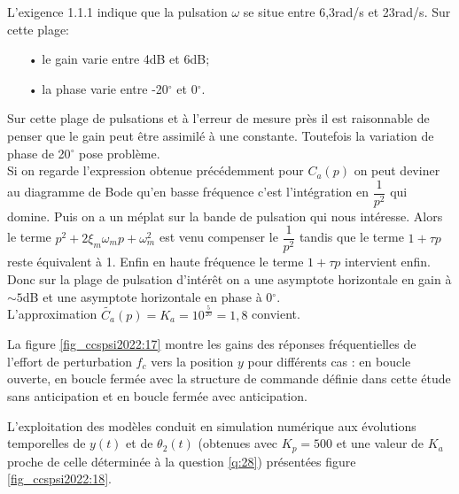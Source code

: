 \ifprof
\begin{corrige}
L'exigence 1.1.1 indique que la pulsation $\omega$ se situe entre 6,3rad/s et 23rad/s. Sur cette plage:
\begin{itemize}
\item[•] le gain varie entre 4dB et 6dB;
\item[•] la phase varie entre -20$^\circ$ et 0$^\circ$.
\end{itemize}

Sur cette plage de pulsations et à l'erreur de mesure près il est raisonnable de penser que le gain peut être assimilé à une constante. Toutefois la variation de phase de 20$^\circ$ pose problème. \\

Si on regarde l'expression obtenue précédemment pour $C_a(p)$ on peut deviner au diagramme de Bode qu'en basse fréquence c'est l'intégration en $\dfrac{1}{p^2}$ qui domine. Puis on a un méplat sur la bande de pulsation qui nous intéresse. Alors le terme $p^2 + 2\xi_m \omega_m p + \omega_m^2$ est venu compenser le $\dfrac{1}{p^2}$ tandis que le terme $1+\tau p$ reste équivalent à 1. Enfin en haute fréquence le terme $1+\tau p$ intervient enfin.\\

Donc sur la plage de pulsation d'intérêt on a une asymptote horizontale en gain à $\sim 5$dB et une asymptote horizontale en phase à 0$^\circ$.\\

L'approximation $\boxed{\widetilde{C_a}(p) = K_a = 10^{\frac{5}{20}} = 1,8}$ convient.
\end{corrige}
\else
\fi

\ifprof
\else
La figure \ref{fig_ccspsi2022:17} montre les gains des réponses fréquentielles de l'effort de perturbation $f_{c}$ vers la position $y$ pour différents cas : en boucle ouverte, en boucle fermée avec la structure de commande définie dans cette étude sans anticipation et en boucle fermée avec anticipation.

L'exploitation des modèles conduit en simulation numérique aux évolutions temporelles de $y(t)$ et de $\theta_{2}(t)$ (obtenues avec $K_{p}=500$ et une valeur de $K_{a}$ proche de celle déterminée à la question \ref{q:28}) présentées figure \ref{fig_ccspsi2022:18}. 
\fi

